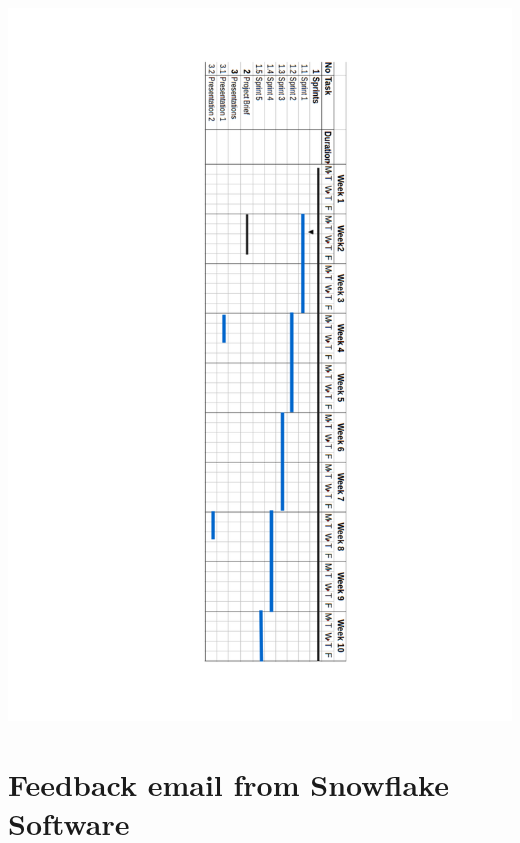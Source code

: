 \documentclass[a4paper, 12pt, twoside]{article}
\begin{document}
\begin{center}
\includegraphics[scale=0.8]{GanttChart.pdf}
\end{center}

\section{Feedback email from Snowflake Software}
\end{document}
